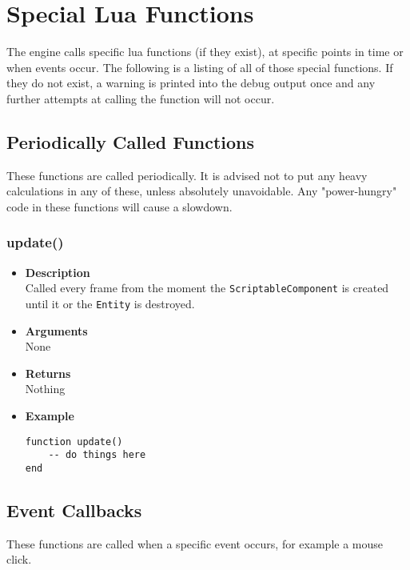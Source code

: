 \documentclass[12pt,a4paper]{article}
\begin{document}
\pagebreak
\section{Special Lua Functions}

The engine calls specific lua functions (if they exist), at specific points in time or when events occur. The following is a listing of all of those special functions.
If they do not exist, a warning is printed into the debug output once and any further attempts at calling the function will not occur.

\subsection{Periodically Called Functions}

These functions are called periodically. It is advised not to put any heavy calculations in any of these, unless absolutely unavoidable. Any "power-hungry" code in these functions will cause a slowdown.

\subsubsection{update()}\label{Update}
\begin{itemize}
	\item[]{\bf Description}
		\\ Called every frame from the moment the \texttt{ScriptableComponent} is created until it or the \texttt{Entity} is destroyed.
	\item[]{\bf Arguments}
		\\ None
	\item[]{\bf Returns}
		\\ Nothing
	\item[]{\bf Example}
\begin{lstlisting}[language={[5.0]Lua}]
function update()
	-- do things here
end
\end{lstlisting}
\end{itemize}


\subsection{Event Callbacks}

These functions are called when a specific event occurs, for example a mouse click.
\end{document}
